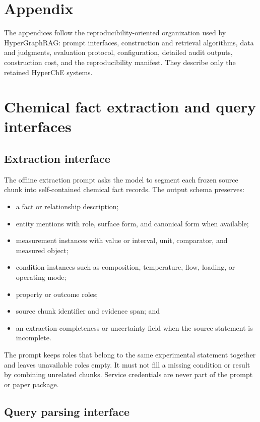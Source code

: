 \appendix
\section*{Appendix}

The appendices follow the reproducibility-oriented organization used by HyperGraphRAG: prompt interfaces, construction and retrieval algorithms, data and judgments, evaluation protocol, configuration, detailed audit outputs, construction cost, and the reproducibility manifest. They describe only the retained HyperChE systems.

\section{Chemical fact extraction and query interfaces}

\subsection{Extraction interface}

The offline extraction prompt asks the model to segment each frozen source chunk into self-contained chemical fact records. The output schema preserves:

\begin{itemize}
\item a fact or relationship description;
\item entity mentions with role, surface form, and canonical form when available;
\item measurement instances with value or interval, unit, comparator, and measured object;
\item condition instances such as composition, temperature, flow, loading, or operating mode;
\item property or outcome roles;
\item source chunk identifier and evidence span; and
\item an extraction completeness or uncertainty field when the source statement is incomplete.
\end{itemize}

The prompt keeps roles that belong to the same experimental statement together and leaves unavailable roles empty. It must not fill a missing condition or result by combining unrelated chunks. Service credentials are never part of the prompt or paper package.

\subsection{Query parsing interface}

